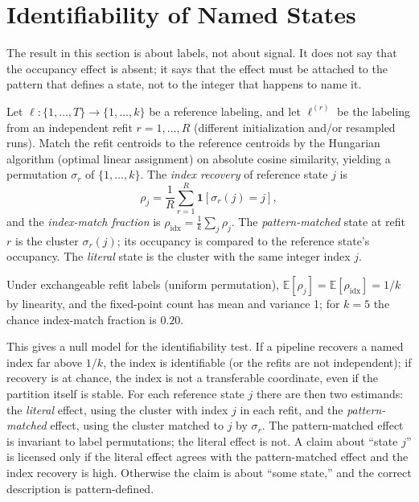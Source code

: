 \documentclass[11pt]{article}
\theoremstyle{definition}
\newcommand{\E}{\mathbb{E}}
\newcommand{\one}{\mathbf{1}}
\begin{document}
\section{Identifiability of Named States}
\label{sec:identifiability}

The result in this section is about labels, not about signal. It does not say that the
occupancy effect is absent; it says that the effect must be attached to the pattern that
defines a state, not to the integer that happens to name it.

Let $\ell:\{1,\dots,T\}\to\{1,\dots,k\}$ be a reference labeling, and let
$\ell^{(r)}$ be the labeling from an independent refit $r=1,\dots,R$ (different
initialization and/or resampled runs). Match the refit centroids to the reference
centroids by the Hungarian algorithm (optimal linear assignment) on absolute cosine similarity, yielding a
permutation $\sigma_r$ of $\{1,\dots,k\}$. The \emph{index recovery} of reference state
$j$ is
\begin{equation}
\rho_j=\frac1R\sum_{r=1}^{R}\one[\sigma_r(j)=j],
\end{equation}
and the \emph{index-match fraction} is
$\rho_{\mathrm{idx}}=\frac1k\sum_j\rho_j$. The \emph{pattern-matched} state at refit
$r$ is the cluster $\sigma_r(j)$; its occupancy is compared to the reference state's
occupancy. The \emph{literal} state is the cluster with the same integer index $j$.

Under exchangeable refit labels (uniform permutation), $\E[\rho_j]=\E[\rho_{\mathrm{idx}}]=1/k$ by linearity, and the fixed-point count has mean and variance 1; for $k=5$ the chance index-match fraction is $0.20$.

This gives a null model for the identifiability test. If a pipeline recovers
a named index far above $1/k$, the index is identifiable (or the refits are not
independent); if recovery is at chance, the index is not a transferable coordinate, even
if the partition itself is stable. For each reference state $j$ there are then two
estimands: the \emph{literal} effect, using the cluster with index $j$ in each refit, and
the \emph{pattern-matched} effect, using the cluster matched to $j$ by $\sigma_r$. The
pattern-matched effect is invariant to label permutations; the literal effect is not. A
claim about ``state $j$'' is licensed only if the literal effect agrees with the
pattern-matched effect and the index recovery is high. Otherwise the claim is about
``some state,'' and the correct description is pattern-defined.
\end{document}
